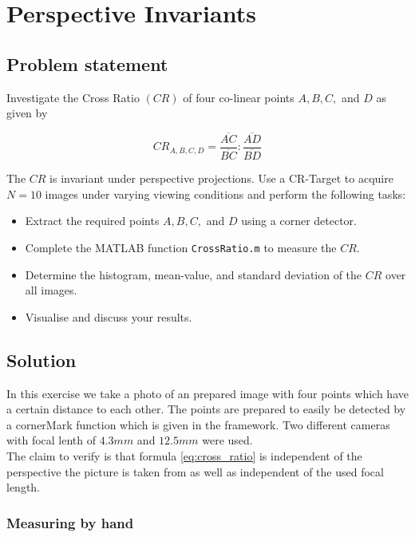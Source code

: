 \documentclass[
a4paper,     %
12pt         %
]{scrartcl}  %
\begin{document}
\pagebreak
\section{Perspective Invariants}

\subsection{Problem statement}

Investigate the Cross Ratio $(CR)$ of four co-linear points $A, B, C,$ and $D$ as given by

\begin{equation}
 CR_{A,B,C,D} = \frac{\overline{AC}}{\overline{BC}} : \frac{\overline{AD}}{\overline{BD}}
 \label{eq:cross_ratio}
\end{equation}

The $CR$ is invariant under perspective projections. Use a CR-Target to acquire $N = 10$ images under varying
viewing conditions and perform the following tasks:

\begin{itemize}
 \item Extract the required points $A, B, C,$ and $D$ using a corner detector.
 \item Complete the MATLAB function \texttt{CrossRatio.m} to measure the $CR$.
 \item Determine the histogram, mean-value, and standard deviation of the $CR$ over all images.
 \item Visualise and discuss your results.
\end{itemize}


\subsection{Solution}

In this exercise we take a photo of an prepared image with four points which have a certain distance to each other.
The points are prepared to easily be detected by a cornerMark function which is given in the framework.
Two different cameras with focal lenth of $4.3mm$ and $12.5mm$ were used.\\

The claim to verify is that formula \ref{eq:cross_ratio} is independent of the perspective the picture is taken from as well as independent of the used focal length.

\subsubsection{Measuring by hand}
\end{document}
